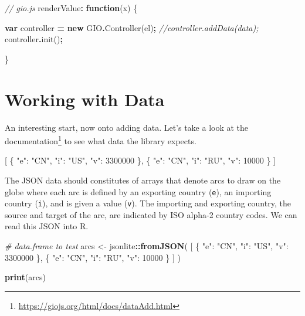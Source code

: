 \documentclass[
]{krantz}
\makeatletter
\newenvironment{Shaded}{\begin{snugshade}}{\end{snugshade}}
\newcommand{\CommentTok}[1]{\textcolor[rgb]{0.37,0.37,0.37}{\textit{#1}}}
\newcommand{\DataTypeTok}[1]{\textcolor[rgb]{0.27,0.27,0.27}{#1}}
\newcommand{\DecValTok}[1]{\textcolor[rgb]{0.06,0.06,0.06}{#1}}
\newcommand{\FunctionTok}[1]{\textcolor[rgb]{0,0,0}{#1}}
\newcommand{\KeywordTok}[1]{\textcolor[rgb]{0.27,0.27,0.27}{\textbf{#1}}}
\newcommand{\NormalTok}[1]{#1}
\newcommand{\OperatorTok}[1]{\textcolor[rgb]{0.43,0.43,0.43}{\textbf{#1}}}
\newcommand{\OtherTok}[1]{\textcolor[rgb]{0.37,0.37,0.37}{#1}}
\newcommand{\StringTok}[1]{\textcolor[rgb]{0.5,0.5,0.5}{#1}}
\renewcommand{\href}[2]{#2\footnote{\url{#1}}}
\newenvironment{kframe}{%
\medskip{}
\setlength{\fboxsep}{.8em}
 \def\at@end@of@kframe{}%
 \ifinner\ifhmode%
  \def\at@end@of@kframe{\end{minipage}}%
  \begin{minipage}{\columnwidth}%
 \fi\fi%
 \def\FrameCommand##1{\hskip\@totalleftmargin \hskip-\fboxsep
 \colorbox{shadecolor}{##1}\hskip-\fboxsep
     \hskip-\linewidth \hskip-\@totalleftmargin \hskip\columnwidth}%
 \MakeFramed {\advance\hsize-\width
   \@totalleftmargin\z@ \linewidth\hsize
   \@setminipage}}%
 {\par\unskip\endMakeFramed%
 \at@end@of@kframe}
\renewenvironment{Shaded}{\begin{kframe}}{\end{kframe}}
\makeatother
\begin{document}
\begin{Shaded}
\begin{Highlighting}[]
\CommentTok{// gio.js}
\NormalTok{renderValue}\OperatorTok{:} \KeywordTok{function}\NormalTok{(x) \{}

  \KeywordTok{var}\NormalTok{ controller }\OperatorTok{=} \KeywordTok{new}\NormalTok{ GIO}\OperatorTok{.}\FunctionTok{Controller}\NormalTok{(el)}\OperatorTok{;}
  \CommentTok{//controller.addData(data);}
\NormalTok{  controller}\OperatorTok{.}\FunctionTok{init}\NormalTok{()}\OperatorTok{;}

\NormalTok{\}}
\end{Highlighting}
\end{Shaded}

\hypertarget{working-with-data}{%
\section*{Working with Data}\label{working-with-data}}


An interesting start, now onto adding data. Let's take a look at the \href{https://giojs.org/html/docs/dataAdd.html}{documentation} to see what data the library expects.

\begin{Shaded}
\begin{Highlighting}[]
\OtherTok{[}
  \FunctionTok{\{}
    \DataTypeTok{"e"}\FunctionTok{:} \StringTok{"CN"}\FunctionTok{,}
    \DataTypeTok{"i"}\FunctionTok{:} \StringTok{"US"}\FunctionTok{,}
    \DataTypeTok{"v"}\FunctionTok{:} \DecValTok{3300000}
  \FunctionTok{\}}\OtherTok{,}
  \FunctionTok{\{}
    \DataTypeTok{"e"}\FunctionTok{:} \StringTok{"CN"}\FunctionTok{,}
    \DataTypeTok{"i"}\FunctionTok{:} \StringTok{"RU"}\FunctionTok{,}
    \DataTypeTok{"v"}\FunctionTok{:} \DecValTok{10000}
  \FunctionTok{\}}
\OtherTok{]}
\end{Highlighting}
\end{Shaded}

The JSON data should constitutes of arrays that denote arcs to draw on the globe where each arc is defined by an exporting country (\texttt{e}), an importing country (\texttt{i}), and is given a value (\texttt{v}). The importing and exporting country, the source and target of the arc, are indicated by ISO alpha-2 country codes. We can read this JSON into R.

\begin{Shaded}
\begin{Highlighting}[]
\CommentTok{\# data.frame to test}
\NormalTok{arcs \textless{}{-}}\StringTok{ }\NormalTok{jsonlite}\OperatorTok{::}\KeywordTok{fromJSON}\NormalTok{(}
  \StringTok{\textquotesingle{}[}
\StringTok{    \{}
\StringTok{      "e": "CN",}
\StringTok{      "i": "US",}
\StringTok{      "v": 3300000}
\StringTok{    \},}
\StringTok{    \{}
\StringTok{      "e": "CN",}
\StringTok{      "i": "RU",}
\StringTok{      "v": 10000}
\StringTok{    \}}
\StringTok{  ]\textquotesingle{}}
\NormalTok{)}

\KeywordTok{print}\NormalTok{(arcs)}
\end{Highlighting}
\end{Shaded}
\end{document}
